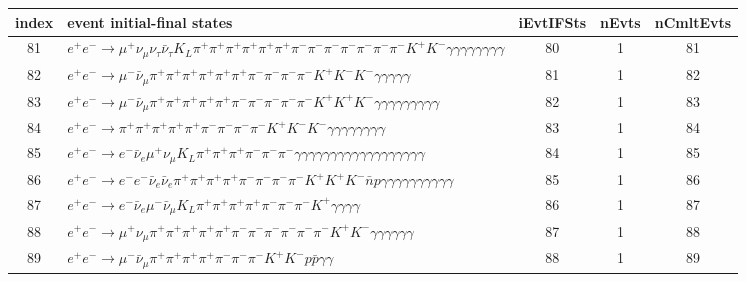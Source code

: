\documentclass[landscape]{article}
\begin{document}
\clearpage

\begin{table}[htbp!]
\small
\centering
\begin{tabular}{|c|>{\centering}p{18cm}|c|c|c|}
\hline
index & event initial-final states & iEvtIFSts & nEvts & nCmltEvts \\
\hline
81 & $ e^{+} e^{-} \rightarrow \mu^{+} \nu_{\mu} \nu_{\tau} \bar{\nu}_{\tau} K_{L} \pi^{+} \pi^{+} \pi^{+} \pi^{+} \pi^{+} \pi^{+} \pi^{-} \pi^{-} \pi^{-} \pi^{-} \pi^{-} \pi^{-} \pi^{-} K^{+} K^{-} \gamma \gamma \gamma \gamma \gamma \gamma \gamma \gamma $ & 80 & 1 & 81 \\
\hline
82 & $ e^{+} e^{-} \rightarrow \mu^{-} \bar{\nu}_{\mu} \pi^{+} \pi^{+} \pi^{+} \pi^{+} \pi^{+} \pi^{+} \pi^{-} \pi^{-} \pi^{-} \pi^{-} K^{+} K^{-} K^{-} \gamma \gamma \gamma \gamma \gamma $ & 81 & 1 & 82 \\
\hline
83 & $ e^{+} e^{-} \rightarrow \mu^{-} \bar{\nu}_{\mu} \pi^{+} \pi^{+} \pi^{+} \pi^{+} \pi^{+} \pi^{-} \pi^{-} \pi^{-} \pi^{-} \pi^{-} K^{+} K^{+} K^{-} \gamma \gamma \gamma \gamma \gamma \gamma \gamma \gamma \gamma $ & 82 & 1 & 83 \\
\hline
84 & $ e^{+} e^{-} \rightarrow \pi^{+} \pi^{+} \pi^{+} \pi^{+} \pi^{+} \pi^{-} \pi^{-} \pi^{-} \pi^{-} K^{+} K^{-} K^{-} \gamma \gamma \gamma \gamma \gamma \gamma \gamma \gamma $ & 83 & 1 & 84 \\
\hline
85 & $ e^{+} e^{-} \rightarrow e^{-} \bar{\nu}_{e} \mu^{+} \nu_{\mu} K_{L} \pi^{+} \pi^{+} \pi^{+} \pi^{-} \pi^{-} \pi^{-} \gamma \gamma \gamma \gamma \gamma \gamma \gamma \gamma \gamma \gamma \gamma \gamma \gamma \gamma \gamma \gamma \gamma \gamma $ & 84 & 1 & 85 \\
\hline
86 & $ e^{+} e^{-} \rightarrow e^{-} e^{-} \bar{\nu}_{e} \bar{\nu}_{e} \pi^{+} \pi^{+} \pi^{+} \pi^{+} \pi^{-} \pi^{-} \pi^{-} \pi^{-} K^{+} K^{+} K^{-} \bar{n} p \gamma \gamma \gamma \gamma \gamma \gamma \gamma \gamma \gamma \gamma $ & 85 & 1 & 86 \\
\hline
87 & $ e^{+} e^{-} \rightarrow e^{-} \bar{\nu}_{e} \mu^{-} \bar{\nu}_{\mu} K_{L} \pi^{+} \pi^{+} \pi^{+} \pi^{+} \pi^{-} \pi^{-} \pi^{-} K^{+} \gamma \gamma \gamma \gamma $ & 86 & 1 & 87 \\
\hline
88 & $ e^{+} e^{-} \rightarrow \mu^{+} \nu_{\mu} \pi^{+} \pi^{+} \pi^{+} \pi^{+} \pi^{+} \pi^{-} \pi^{-} \pi^{-} \pi^{-} \pi^{-} \pi^{-} K^{+} K^{-} \gamma \gamma \gamma \gamma \gamma \gamma $ & 87 & 1 & 88 \\
\hline
89 & $ e^{+} e^{-} \rightarrow \mu^{-} \bar{\nu}_{\mu} \pi^{+} \pi^{+} \pi^{+} \pi^{+} \pi^{-} \pi^{-} \pi^{-} K^{+} K^{-} p \bar{p} \gamma \gamma $ & 88 & 1 & 89 \\

\end{tabular}
\end{table}
\end{document}
